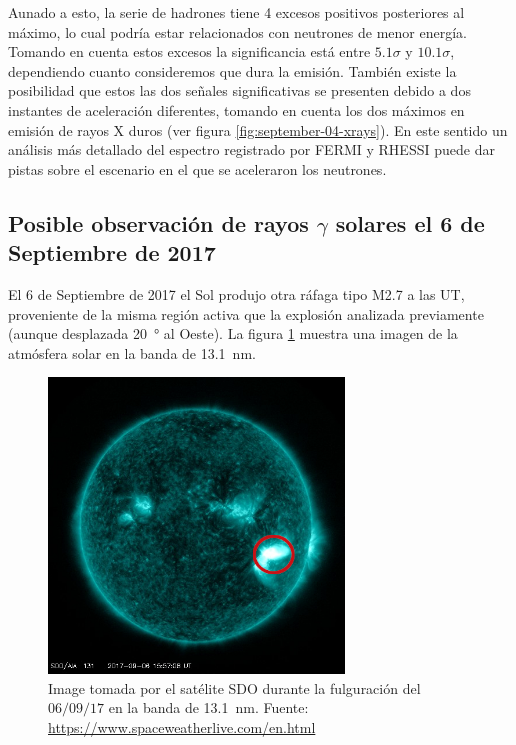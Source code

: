 Aunado a esto, la serie de hadrones tiene \num{4} excesos positivos posteriores al máximo, lo cual podría estar relacionados con neutrones de menor energía. Tomando en cuenta estos excesos la significancia está entre $5.1\sigma$ y $10.1\sigma$, dependiendo cuanto consideremos que dura la emisión. También existe la posibilidad que estos las dos señales significativas se presenten debido a dos instantes de aceleración diferentes, tomando en cuenta los dos máximos en emisión de rayos X duros (ver figura \ref{fig:september-04-xrays}). En este sentido un análisis más detallado del espectro registrado por FERMI y RHESSI puede dar pistas sobre el escenario en el que se aceleraron los neutrones.

\subsection{Posible observación de rayos \texorpdfstring{$\scriptstyle\gamma$}{gamma} solares el 6 de Septiembre de 2017}

El \num{6} de Septiembre de \num{2017} el Sol produjo otra ráfaga tipo M\num{2.7} a las  UT, proveniente de la misma región activa que la explosión analizada previamente (aunque desplazada \SI{20}{\degree} al Oeste). La figura \ref{fig:september-06-flare} muestra una imagen de la atmósfera solar en la banda de \SI{13.1}{\nano\metre}.

\begin{figure}
        \centering
        \includegraphics[width=0.7\textwidth]{sdo170906-1550-13}
        \caption{Image tomada por el satélite SDO durante la fulguración del $06/09/17$ en la banda de \SI{13.1}{\nano\metre}. Fuente: \url{https://www.spaceweatherlive.com/en.html}}
        \label{fig:september-06-flare}
\end{figure}

